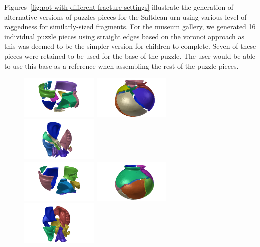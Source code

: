\documentclass[acmlarge,screen,dvipsnames]{acmart}
\begin{document}
Figures~\ref{fig:pot-with-different-fracture-settings} illustrate the
generation of alternative versions of puzzles pieces for the Saltdean
urn using various level of raggedness for similarly-sized
fragments. For the museum gallery, we generated 16 individual puzzle
pieces using straight edges based on the voronoi approach as this was
deemed to be the simpler version for children to complete. Seven of
these pieces were retained to be used for the base of the puzzle. The
user would be able to use this base as a reference when assembling the
rest of the puzzle pieces.

\begin{figure}[htb]
  \includegraphics[width=0.33\textwidth]{images/ambercuppuzzle0}%
  \includegraphics[width=0.33\textwidth]{images/saltdeanpuzzle0}%
  \includegraphics[width=0.33\textwidth]{images/elephantpuzzle0}\\
  \includegraphics[width=0.33\textwidth]{images/ambercuppuzzle2}%
  \includegraphics[width=0.33\textwidth]{images/saltdeanpuzzle1}%
  \includegraphics[width=0.33\textwidth]{images/elephantpuzzle1}\\

\end{figure}
\end{document}
